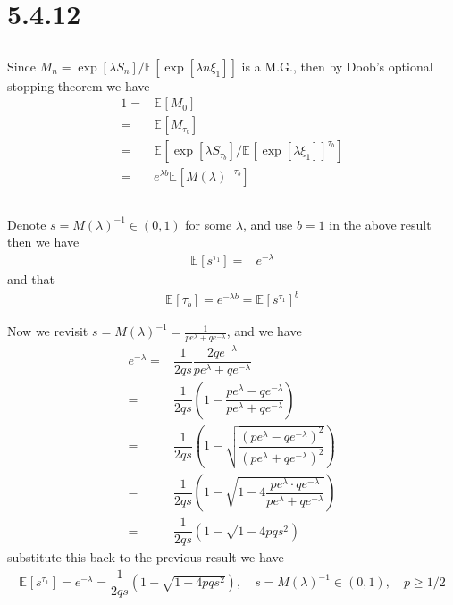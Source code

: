 \documentclass[11pt,a4paper]{ctexart}
\numberwithin{equation}{section}%
\begin{document}
\section{5.4.12}

\subsection{}
Since $ M_n = \exp\left[ \lambda S_n \right]/\mathbb{E}_{  }\left[ \exp\left[ \lambda n\xi _1 \right] \right]  $ is a M.G., then by Doob's optional stopping theorem we have
\begin{align*}
    1= &\mathbb{E}_{  }\left[ M_0 \right]\\
    =&\mathbb{E}_{  }\left[ M_{\tau_b} \right]  \\
    =& \mathbb{E}_{  }\left[ \exp\left[ \lambda S_{\tau_b} \right] / \mathbb{E}_{  }\left[ \exp\left[ \lambda \xi _1 \right] \right] ^{\tau_b}  \right] \\
    =&e^{\lambda b}\mathbb{E}_{  }\left[ M(\lambda )^{-\tau_b} \right] 
\end{align*}


\subsection{}



Denote $ s=M(\lambda )^{-1}\in (0,1) $ for some $ \lambda  $, and use $ b=1 $ in the above result then we have
\begin{align*}
    \mathbb{E}_{  }\left[ s^{\tau_1} \right]=& e^{-\lambda }  
\end{align*}
and that
\begin{align*}
    \mathbb{E}_{  }\left[ \tau_b \right] = e^{-\lambda b}= \mathbb{E}_{  }\left[ s^{\tau_1} \right]^b
\end{align*}

Now we revisit $ s = M(\lambda )^{-1} = \frac{1}{pe^{\lambda }+qe^{-\lambda }} $, and we have
\begin{align*}
    e^{-\lambda }=&\dfrac{ 1 }{ 2qs } \dfrac{ 2qe^{-\lambda } }{ pe^{\lambda }+qe^{-\lambda } }\\
    =&\dfrac{ 1 }{ 2qs }\left( 1-\dfrac{ pe^{\lambda }-qe^{-\lambda } }{ pe^{\lambda }+qe^{-\lambda } }  \right)\\
    =&\dfrac{ 1 }{ 2qs }\left( 1- \sqrt{ \dfrac{ (pe^{\lambda }-qe^{-\lambda })^2 }{ (pe^{\lambda }+qe^{-\lambda })^2 } }  \right)\\
    =&\dfrac{ 1 }{ 2qs }\left( 1- \sqrt{ 1- 4\dfrac{ pe^{\lambda }\cdot qe^{-\lambda } }{ pe^{\lambda }+qe^{-\lambda } }  }  \right)\\
    =&\dfrac{ 1 }{ 2qs }\left( 1- \sqrt{ 1- 4pqs^2 }  \right)
\end{align*}
substitute this back to the previous result we have
\begin{align*}
    \mathbb{E}_{  }\left[ s^{\tau_1} \right] = e^{-\lambda } = \dfrac{ 1 }{ 2qs }\left( 1- \sqrt{ 1- 4pqs^2 }  \right),\quad s=M(\lambda )^{-1}\in (0,1),\quad p \geq 1/2 
\end{align*}
\end{document}
